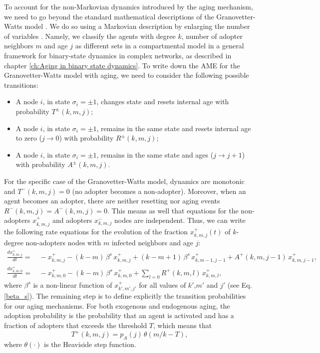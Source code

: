 To account for the non-Markovian dynamics introduced by the aging mechanism, we need to go beyond the standard mathematical descriptions of the Granovetter-Watts model \cite{gleeson-2007,gleeson-2008,gleeson-2013}. We do so using a Markovian description by enlarging the number of variables \cite{peralta-2020C,peralta-2020A}. Namely, we classify the agents with degree $k$, number of adopter neighbors $m$ and age $j$ as different sets in a compartmental model in a general framework for binary-state dynamics in complex networks, as described in chapter \ref{ch:Aging in binary state dynamics}. To write down the AME for the Granovetter-Watts model with aging, we need to consider the following possible transitions:
\begin{itemize}
    \item A node $i$, in state $\sigma_i = \pm 1$, changes state and resets internal age with probability $T^{\pm} (k,m,j)$;
    \item A node $i$, in state $\sigma_i = \pm 1$, remains in the same state and resets internal age to zero ($j \to 0$) with probability $R^{\pm} (k,m,j)$;
    \item A node $i$, in state $\sigma_i = \pm 1$, remains in the same state and ages ($j \to j+1$) with probability $A^{\pm} (k,m,j)$.
\end{itemize}
For the specific case of the Granovetter-Watts model, dynamics are monotonic and $T^{-} (k,m,j) = 0$ (no adopter becomes a non-adopter). Moreover, when an agent becomes an adopter, there are neither resetting nor aging events $R^{-} (k,m,j) = A^{-} (k,m,j) = 0$. This means as well that equations for the non-adopters $x^{+}_{k,m,j}$ and adopters $x^{-}_{k,m,j}$ nodes are independent. Thus, we can write the following rate equations for the evolution of the fraction $x^{+}_{k,m,j} (t)$ of $k$-degree non-adopters nodes with $m$ infected neighbors and age $j$:
\begin{align}
\label{eq:AME_Threshold}
\frac{d x^{+}_{k,m,j}}{dt} = & \,  - x^{+}_{k,m,j} - (k-m)\, \beta^s \, x^{+}_{k,m,j} + (k-m+1) \, \beta^s \, x^{+}_{k,m-1,j-1} + A^{+} (k,m,j-1)\, x^{+}_{k,m,j-1},  \\
\frac{d x^{+}_{k,m,0}}{dt}  = & \,   - x^{+}_{k,m,0} - (k - m)\, \beta^s   \,x^{+}_{k,m,0} + \sum_{l = 0} R^{+} (k,m,l)\, x^{+}_{k,m,l}, \nonumber 
\end{align}
where $\beta^s$ is a non-linear function of $x^{+}_{k',m',j'}$ for all values of $k'$,$m'$ and $j'$  (see Eq. \eqref{beta_s}). The remaining step is to define explicitly the transition probabilities for our aging mechanisms. For both exogenous and endogenous aging, the adoption probability is the probability that an agent is activated and has a fraction of adopters that exceeds the threshold $T$, which means that 
\begin{equation}
T^{+}(k,m,j) = p_A(j) \, \theta(m/k - T),
\end{equation} 
where $\theta(\cdot)$ is the Heaviside step function. 

